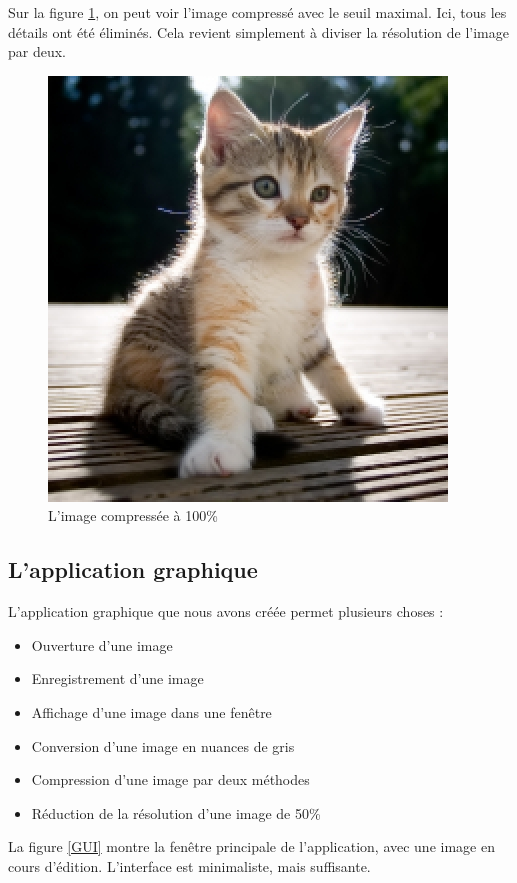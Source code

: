 \documentclass{article}
\begin{document}
Sur la figure \ref{chat3}, on peut voir l'image compressé avec le seuil maximal. Ici, tous les détails ont été éliminés. Cela revient simplement à diviser la résolution de l'image par deux.

\begin{figure}[!hb]
\centering
\includegraphics[scale=0.8]{chat_compress255.jpg}
\caption{L'image compressée à 100\%}
\label{chat3}
\end{figure}


\clearpage

\subsection{L'application graphique}

L'application graphique que nous avons créée permet plusieurs choses :

\begin{itemize}
\item Ouverture d'une image
\item Enregistrement d'une image
\item Affichage d'une image dans une fenêtre
\item Conversion d'une image en nuances de gris
\item Compression d'une image par deux méthodes
\item Réduction de la résolution d'une image de 50\%
\end{itemize}

La figure \ref{GUI} montre la fenêtre principale de l'application, avec une image en cours d'édition. L'interface est minimaliste, mais suffisante.
\end{document}
